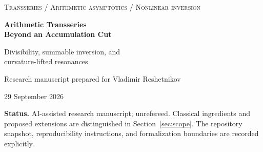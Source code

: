 \documentclass[11pt,a4paper]{article}
\numberwithin{equation}{section}
\theoremstyle{definition}
\theoremstyle{remark}
\newcommand{\ee}{\mathrm e}
\newcommand{\ind}{\mathbf 1}
\begin{document}
\hypersetup{pageanchor=false}
\begin{titlepage}
\vspace*{12mm}
\noindent\textsc{Transseries \; / \; Arithmetic asymptotics \; / \; Nonlinear inversion}
\vspace{15mm}
\begin{center}
{\LARGE\bfseries Arithmetic Transseries\\[4mm]
Beyond an Accumulation Cut\par}
\vspace{8mm}
{\Large Divisibility, summable inversion, and\\[2mm]
curvature-lifted resonances\par}
\vspace{14mm}
{\large Research manuscript prepared for Vladimir Reshetnikov\par}
\vspace{3mm}
29 September 2026
\end{center}
\vspace{12mm}
\begin{abstract}
Divisor-counting sequences have corrections with arithmetic coefficients
$\ind_{d\mid n}$ and exponential actions $a(1-1/d)$ accumulating at $a$.
This combination defeats finite-grid truncation without defeating Hahn
well-ordering. We construct an arithmetic Hahn ring and a compatible scale
of weighted Banach algebras that retain the indicators exactly. An lcm
convolution handles arithmetic multiplication, while an action--label weight
makes the entire accumulating block summable on expanding families of
analytic sheets. For the elementary input block, membership has the exact
criterion $\sum_d |c_d|\ee^{-ad}<\infty$.

We prove a convergent, all-action, fixed-label inverse theorem for
$\ee^{ax}(1+E_n(x))/x$, with explicit coefficients and a geometric remainder.
It applies to necklaces and primitive necklaces on their exact ranges.
A second result identifies the first inverse sector beyond the primitive
action cut: it has action $a$, but its leading pure-exponential amplitude
cancels, leaving a curvature-induced factor of order $X^{-1}$.
An exact coefficient transformation explains this phenomenon at every
homogeneous order and gives its extension to cores $\ee^{ax}x^{-b}$.

The construction answers a specified algebra-and-summation direction in the
ProveIt companion volume. It is not a canonical interpolation of an
arithmetic sequence, a field containing nontrivial indicators, or a general
resurgence theorem. Full mathematical proofs are supplied; 964 exact finite
assertions and 48 high-precision error checks provide supplementary audits.
These results are not Lean-verified, and publication-level priority has not
been established.
\end{abstract}
\vfill
\noindent\small\textbf{Status.} AI-assisted research manuscript; unrefereed.
Classical ingredients and proposed extensions are distinguished in
Section~\ref{sec:scope}. The repository snapshot, reproducibility instructions,
and formalization boundaries are recorded explicitly.
\end{titlepage}
\end{document}
